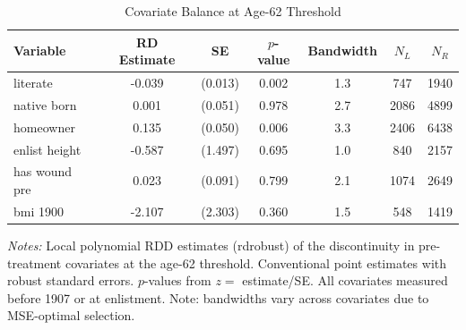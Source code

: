 \begin{table}[htbp]
\centering
\caption{Covariate Balance at Age-62 Threshold}
\label{tab:balance}
\begin{tabular}{lcccccc}
\toprule
  Variable & RD Estimate & SE & $p$-value & Bandwidth & $N_L$ & $N_R$ \\
\midrule
  literate & -0.039 & (0.013) & 0.002 & 1.3 & 747 & 1940 \\
  native born & 0.001 & (0.051) & 0.978 & 2.7 & 2086 & 4899 \\
  homeowner & 0.135 & (0.050) & 0.006 & 3.3 & 2406 & 6438 \\
  enlist height & -0.587 & (1.497) & 0.695 & 1.0 & 840 & 2157 \\
  has wound pre & 0.023 & (0.091) & 0.799 & 2.1 & 1074 & 2649 \\
  bmi 1900 & -2.107 & (2.303) & 0.360 & 1.5 & 548 & 1419 \\
\bottomrule
\end{tabular}
\begin{tablenotes}[flushleft]
\small
\item \textit{Notes:} Local polynomial RDD estimates (rdrobust) of the discontinuity in pre-treatment covariates at the age-62 threshold. Conventional point estimates with robust standard errors. $p$-values from $z = $ estimate/SE. All covariates measured before 1907 or at enlistment. Note: bandwidths vary across covariates due to MSE-optimal selection.
\end{tablenotes}
\end{table}
